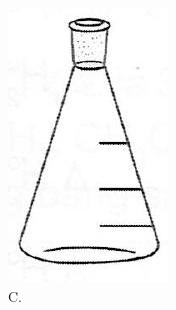 \documentclass[10pt]{article}
\begin{document}
\begin{figure}[h]
\begin{center}
\captionsetup{labelformat=empty}
\caption{C.}
  \includegraphics[width=\textwidth]{2025_10_23_de6f5713836e4e91b3c8g-014(3)}
\end{center}
\end{figure}
\end{document}
